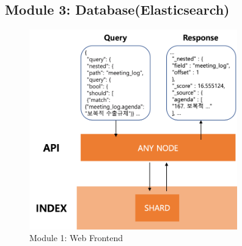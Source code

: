 \documentclass[conference]{IEEEtran}
\begin{document}
  \subsection{Module 3: Database(Elasticsearch)}
\begin{figure}[htbp]
\centerline{\includegraphics[width=90mm,scale=0.5]{fig/6_8.png}}
\caption{Module 1: Web Frontend}
\label{fig}
\end{figure}
\end{document}
